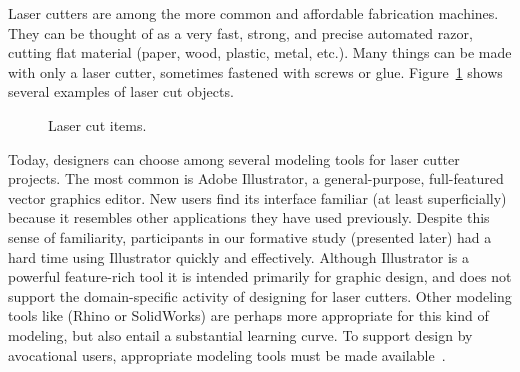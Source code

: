 \documentclass{article}
\begin{document}
Laser cutters are among the more common and affordable fabrication
machines. They can be thought of as a very fast, strong, and precise
automated razor, cutting flat material (paper, wood, plastic, metal,
etc.). Many things can be made with only a laser cutter, sometimes
fastened with screws or glue.  Figure~\ref{fig:laser-example} shows
several examples of laser cut objects.

\begin{figure}[b]
\centering 
{}
\caption{Laser cut items.}
\label{fig:laser-example}
\end{figure}



Today, designers can choose among several modeling tools for laser
cutter projects. The most common is Adobe Illustrator, a
general-purpose, full-featured vector graphics editor. New users find
its interface familiar (at least superficially) because it resembles
other applications they have used previously. Despite this sense of
familiarity, participants in our formative study (presented later) had
a hard time using Illustrator quickly and effectively. Although
Illustrator is a powerful feature-rich tool it is intended primarily
for graphic design, and does not support the domain-specific activity
of designing for laser cutters. Other modeling tools like (Rhino or
SolidWorks) are perhaps more appropriate for this kind of modeling,
but also entail a substantial learning curve. To support design by
avocational users, appropriate modeling tools must be made
available~\cite{lipson-homefactory}.
\end{document}
